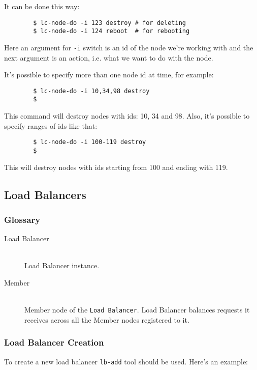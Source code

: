 \documentclass[a4paper]{report}
\begin{document}
	       It can be done this way:

	       \begin{verbatim}
		$ lc-node-do -i 123 destroy # for deleting
		$ lc-node-do -i 124 reboot  # for rebooting
		\end{verbatim}

	       Here an argument for \texttt{-i} switch is an id of the node we're working
	       with and the next argument is an action, i.e. what we want to do with the node.

	       It's possible to specify more than one node id at time, for example:

	       \begin{verbatim}
		$ lc-node-do -i 10,34,98 destroy
		$
		\end{verbatim}

	       This command will destroy nodes with ids: 10, 34 and 98. Also, it's possible to
	       specify ranges of ids like that:

	       \begin{verbatim}
		$ lc-node-do -i 100-119 destroy
		$
		\end{verbatim}

	      This will destroy nodes with ids starting from 100 and ending with 119.

          \subsection{Load Balancers}
		 \subsubsection{Glossary}
		    \begin{description}
		       \item[Load Balancer] \hfill \\
		       Load Balancer instance.
		       \item[Member] \hfill \\
                       Member node of the \texttt{Load Balancer}. Load Balancer balances
                       requests it receives across all the Member nodes registered to it.
		    \end{description}
                \subsubsection{Load Balancer Creation}
                To create a new load balancer \texttt{lb-add} tool should be used. Here's an example:
\end{document}
